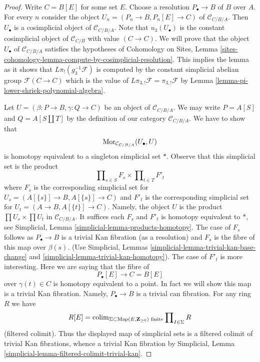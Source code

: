 \begin{proof}
Write $C = B[E]$ for some set $E$. Choose a resolution
$P_\bullet \to B$ of $B$ over $A$. For every $n$ consider
the object $U_n = (P_n \to B, P_n[E] \to C)$ of $\mathcal{C}_{C/B/A}$.
Then $U_\bullet$ is a cosimplicial object of $\mathcal{C}_{C/B/A}$.
Note that $u_3(U_\bullet)$ is the constant cosimplicial
object of $\mathcal{C}_{C/B}$ with value $(C \to C)$.
We will prove that the object $U_\bullet$ of $\mathcal{C}_{C/B/A}$
satisfies the hypotheses of
Cohomology on Sites, Lemma
\ref{sites-cohomology-lemma-compute-by-cosimplicial-resolution}.
This implies the lemma as it shows that $L\pi_!(g_3^{-1}\mathcal{F})$
is computed by the constant simplicial abelian group
$\mathcal{F}(C \to C)$ which is the value of
$L\pi_{3, !}\mathcal{F} = \pi_{3, !}\mathcal{F}$ by
Lemma \ref{lemma-pi-lower-shriek-polynomial-algebra}.

\medskip\noindent
Let $U = (\beta : P \to B, \gamma : Q \to C)$ be an object of
$\mathcal{C}_{C/B/A}$. We may write $P = A[S]$ and $Q = A[S \amalg T]$
by the definition of our category $\mathcal{C}_{C/B/A}$. We have to show that
$$
\mathop{\mathrm{Mor}}\nolimits_{\mathcal{C}_{C/B/A}}(U_\bullet, U)
$$
is homotopy equivalent to a singleton simplicial set $*$. Observe that this
simplicial set is the product
$$
\prod\nolimits_{s \in S} F_s \times \prod\nolimits_{t \in T} F'_t
$$
where $F_s$ is the corresponding simplicial set for
$U_s = (A[\{s\}] \to B, A[\{s\}] \to C)$
and $F'_t$ is the corresponding simplicial set for
$U_t = (A \to B, A[\{t\}] \to C)$. Namely, the object $U$
is the product $\prod U_s \times \prod U_t$ in $\mathcal{C}_{C/B/A}$.
It suffices each $F_s$ and $F'_t$ is homotopy equivalent to $*$, see
Simplicial, Lemma \ref{simplicial-lemma-products-homotopy}.
The case of $F_s$ follows as $P_\bullet \to B$ is a trivial Kan
fibration (as a resolution) and $F_s$ is the fibre of this map over
$\beta(s)$. (Use Simplicial, Lemmas
\ref{simplicial-lemma-trivial-kan-base-change} and
\ref{simplicial-lemma-trivial-kan-homotopy}).
The case of $F'_t$ is more interesting. Here we are saying that
the fibre of
$$
P_\bullet[E] \longrightarrow C = B[E]
$$
over $\gamma(t) \in C$ is homotopy equivalent to a point. In fact we
will show this map is a trivial Kan fibration. Namely,
$P_\bullet \to B$ is a trivial can fibration. For any ring $R$
we have
$$
R[E] =
\mathop{\mathrm{colim}}\nolimits_{\Sigma \subset \text{Map}(E, \mathbf{Z}_{\geq 0})\text{ finite}}
\prod\nolimits_{I \in \Sigma} R
$$
(filtered colimit). Thus the displayed map of simplicial sets is a
filtered colimit of trivial Kan fibrations, whence a trivial Kan fibration
by Simplicial, Lemma \ref{simplicial-lemma-filtered-colimit-trivial-kan}.
\end{proof}

